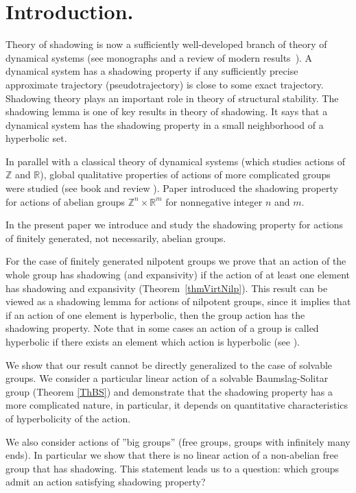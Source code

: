 \section{Introduction. }

Theory of shadowing is now a sufficiently well-developed branch of theory of dynamical systems (see monographs \cite{PilBook, PalmBook} and a review of modern results~\cite{Pil2}). A dynamical system has a shadowing property if any sufficiently precise approximate trajectory (pseudotrajectory) is close to some exact trajectory. Shadowing theory plays an important role in theory of structural stability. The shadowing lemma \cite{Anosov, Bowen} is one of key results in theory of shadowing. It says that a dynamical system has the shadowing property in a small neighborhood of a hyperbolic set.

In parallel with a classical theory of dynamical systems (which studies actions of $\mathbb{Z}$ and $\mathbb{R}$), global qualitative properties of actions of more complicated groups were studied
(see book \cite{Katok2} and review \cite{Fisher}).
Paper \cite{PilTikh} introduced the shadowing property for actions of abelian groups $\mathbb{Z}^n \times \mathbb{R}^m$ for nonnegative integer $n$ and $m$.

In the present paper we introduce and study the shadowing property for actions of finitely generated, not necessarily, abelian groups.

For the case of finitely generated nilpotent groups we prove that an action of the whole group has shadowing (and expansivity) if the action of at least one element has shadowing and expansivity (Theorem~\ref{thmVirtNilp}).
This result can be viewed as a shadowing lemma for actions of nilpotent groups, since it implies that if an action of one element is hyperbolic, then the group action has the shadowing property. Note that in some cases an action of a  group is called hyperbolic if there exists an element which action is hyperbolic (see \cite{Barbot, Katok2, Hurder}). 

We show that our result cannot be directly generalized to the case of solvable groups. We consider a particular linear action of a solvable Baumslag-Solitar group (Theorem \ref{ThBS}) and demonstrate that the shadowing property has a more complicated nature, in particular, it depends on quantitative characteristics of hyperbolicity of the action.

We also consider actions of ''big groups'' (free groups, groups with infinitely many ends). In particular we show that there is no linear action of a non-abelian free group that has shadowing. This statement leads us to a question: which groups admit an action satisfying shadowing property?

